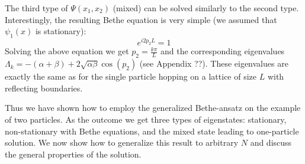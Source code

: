 \documentclass[aps,showpacs,twocolumn,floatfix,prx,superscriptaddress]{revtex4-1}
\begin{document}
The third type of $\Psi(x_1, x_2)$ (mixed) can be solved similarly to the second type. Interestingly, the resulting Bethe equation is very simple (we assumed that $\psi_1(x)$ is stationary):
\begin{equation}
    \label{eq:betheEqTwo1}
    e^{i2p_2L} = 1
\end{equation}
Solving the above equation we get $p_2 = \frac{k\pi}{L}$ and the corresponding eigenvalues $\Lambda_k = -(\alpha+\beta)+2\sqrt{\alpha\beta}\cos(p_2)$ (see Appendix ??). These eigenvalues are exactly the same as for the single particle hopping on a lattice of size $L$ with reflecting boundaries. 

Thus we have shown how to employ the generalized Bethe-ansatz on the example of two particles. As the outcome we get three types of eigenstates: stationary, non-stationary with Bethe equations, and the mixed state leading to one-particle solution. We now show how to generalize this result to arbitrary $N$ and discuss the general properties of the solution.  %

\end{document}
